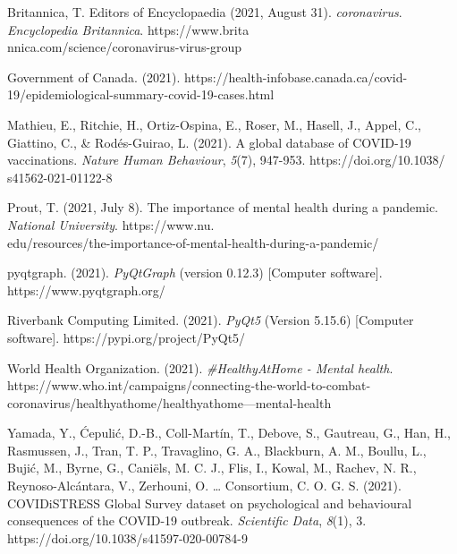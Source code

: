 \documentclass[fontsize=11pt]{article}
\begin{document}

    \hangindent=0.7cm
    Britannica, T. Editors of Encyclopaedia (2021, August 31). \textit{coronavirus}. \textit{Encyclopedia Britannica}. https://www.brita\\nnica.com/science/coronavirus-virus-group

    \hangindent=0.7cm \noindent
    Government of Canada. (2021). https://health-infobase.canada.ca/covid-19/epidemiological-summary-covid-19-cases.html

    \hangindent=0.7cm \noindent
    Mathieu, E., Ritchie, H., Ortiz-Ospina, E., Roser, M., Hasell, J., Appel, C., Giattino, C., \& Rodés-Guirao, L. (2021). A global database of COVID-19 vaccinations. \textit{Nature Human Behaviour}, \textit{5}(7), 947-953. https://doi.org/10.1038/\\s41562-021-01122-8

    \hangindent=0.7cm \noindent
    Prout, T. (2021, July 8). The importance of mental health during a pandemic. \textit{National University}. https://www.nu.\\edu/resources/the-importance-of-mental-health-during-a-pandemic/

    \hangindent=0.7cm \noindent
    pyqtgraph. (2021). \textit{PyQtGraph} (version 0.12.3) [Computer software]. https://www.pyqtgraph.org/

    \hangindent=0.7cm \noindent
    Riverbank Computing Limited. (2021). \textit{PyQt5} (Version 5.15.6) [Computer software]. https://pypi.org/project/PyQt5/

    \hangindent=0.7cm \noindent
    World Health Organization. (2021). \textit{\#HealthyAtHome - Mental health}. https://www.who.int/campaigns/connecting-the-world-to-combat-coronavirus/healthyathome/healthyathome---mental-health

    \hangindent=0.7cm \noindent
    Yamada, Y., Ćepulić, D.-B., Coll-Martín, T., Debove, S., Gautreau, G., Han, H., Rasmussen, J., Tran, T. P., Travaglino, G. A., Blackburn, A. M., Boullu, L., Bujić, M., Byrne, G., Caniëls, M. C. J., Flis, I., Kowal, M., Rachev, N. R., Reynoso-Alcántara, V., Zerhouni, O. … Consortium, C. O. G. S. (2021). COVIDiSTRESS Global Survey dataset on psychological and behavioural consequences of the COVID-19 outbreak. \textit{Scientific Data}, \textit{8}(1), 3. https://doi.org/10.1038/s41597-020-00784-9
\end{document}
